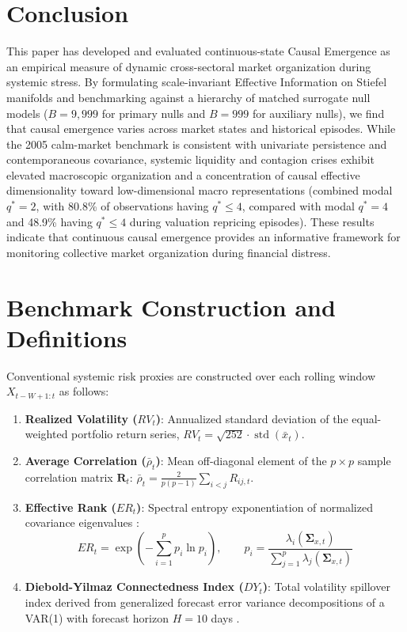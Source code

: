 \documentclass[review,12pt,authoryear]{elsarticle}
\begin{document}
\section{Conclusion}
\label{sec:conclusion}

This paper has developed and evaluated continuous-state Causal Emergence as an empirical measure of dynamic cross-sectoral market organization during systemic stress. By formulating scale-invariant Effective Information on Stiefel manifolds and benchmarking against a hierarchy of matched surrogate null models ($B=9,999$ for primary nulls and $B=999$ for auxiliary nulls), we find that causal emergence varies across market states and historical episodes. While the 2005 calm-market benchmark is consistent with univariate persistence and contemporaneous covariance, systemic liquidity and contagion crises exhibit elevated macroscopic organization and a concentration of causal effective dimensionality toward low-dimensional macro representations (combined modal $q^* = 2$, with 80.8\% of observations having $q^* \le 4$, compared with modal $q^* = 4$ and 48.9\% having $q^* \le 4$ during valuation repricing episodes). These results indicate that continuous causal emergence provides an informative framework for monitoring collective market organization during financial distress.

\appendix

\section{Benchmark Construction and Definitions}
\label{app:benchmarks}
Conventional systemic risk proxies are constructed over each rolling window $X_{t-W+1:t}$ as follows:
\begin{enumerate}
    \item \textbf{Realized Volatility ($RV_t$)}: Annualized standard deviation of the equal-weighted portfolio return series, $RV_t = \sqrt{252} \cdot \operatorname{std}(\bar{x}_t)$.
    \item \textbf{Average Correlation ($\bar{\rho}_t$)}: Mean off-diagonal element of the $p \times p$ sample correlation matrix $\mathbf{R}_t$: $\bar{\rho}_t = \frac{2}{p(p-1)} \sum_{i < j} R_{ij,t}$.
    \item \textbf{Effective Rank ($ER_t$)}: Spectral entropy exponentiation of normalized covariance eigenvalues \citep{roy2007effective}:
    \begin{equation}
    ER_t = \exp\left( -\sum_{i=1}^p p_i \ln p_i \right), \qquad p_i = \frac{\lambda_i(\boldsymbol{\Sigma}_{x,t})}{\sum_{j=1}^p \lambda_j(\boldsymbol{\Sigma}_{x,t})}
    \end{equation}
    \item \textbf{Diebold-Yilmaz Connectedness Index ($DY_t$)}: Total volatility spillover index derived from generalized forecast error variance decompositions of a VAR(1) with forecast horizon $H = 10$ days \citep{diebold2012better}.
\end{enumerate}
\end{document}
